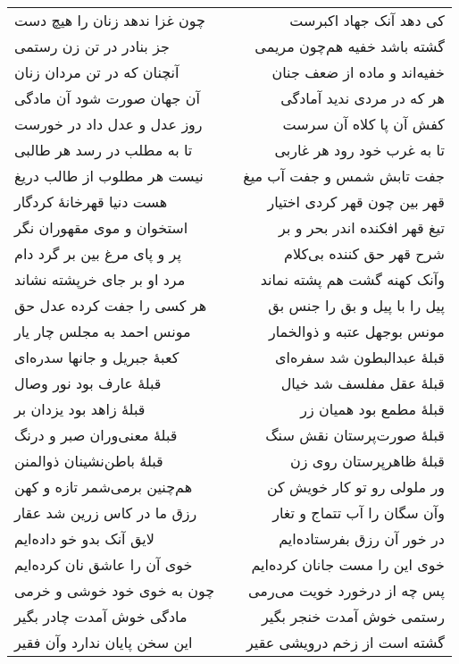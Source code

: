 \begin{center}
\begin{longtable}{l p{0.5cm} r}
\\
چون غزا ندهد زنان را هیچ دست
&&
کی دهد آنک جهاد اکبرست
\\
جز بنادر در تن زن رستمی
&&
گشته باشد خفیه هم‌چون مریمی
\\
آنچنان که در تن مردان زنان
&&
خفیه‌اند و ماده از ضعف جنان
\\
آن جهان صورت شود آن مادگی
&&
هر که در مردی ندید آمادگی
\\
روز عدل و عدل داد در خورست
&&
کفش آن پا کلاه آن سرست
\\
تا به مطلب در رسد هر طالبی
&&
تا به غرب خود رود هر غاربی
\\
نیست هر مطلوب از طالب دریغ
&&
جفت تابش شمس و جفت آب میغ
\\
هست دنیا قهرخانهٔ کردگار
&&
قهر بین چون قهر کردی اختیار
\\
استخوان و موی مقهوران نگر
&&
تیغ قهر افکنده اندر بحر و بر
\\
پر و پای مرغ بین بر گرد دام
&&
شرح قهر حق کننده بی‌کلام
\\
مرد او بر جای خرپشته نشاند
&&
وآنک کهنه گشت هم پشته نماند
\\
هر کسی را جفت کرده عدل حق
&&
پیل را با پیل و بق را جنس بق
\\
مونس احمد به مجلس چار یار
&&
مونس بوجهل عتبه و ذوالخمار
\\
کعبهٔ جبریل و جانها سدره‌ای
&&
قبلهٔ عبدالبطون شد سفره‌ای
\\
قبلهٔ عارف بود نور وصال
&&
قبلهٔ عقل مفلسف شد خیال
\\
قبلهٔ زاهد بود یزدان بر
&&
قبلهٔ مطمع بود همیان زر
\\
قبلهٔ معنی‌وران صبر و درنگ
&&
قبلهٔ صورت‌پرستان نقش سنگ
\\
قبلهٔ باطن‌نشینان ذوالمنن
&&
قبلهٔ ظاهرپرستان روی زن
\\
هم‌چنین برمی‌شمر تازه و کهن
&&
ور ملولی رو تو کار خویش کن
\\
رزق ما در کاس زرین شد عقار
&&
وآن سگان را آب تتماج و تغار
\\
لایق آنک بدو خو داده‌ایم
&&
در خور آن رزق بفرستاده‌ایم
\\
خوی آن را عاشق نان کرده‌ایم
&&
خوی این را مست جانان کرده‌ایم
\\
چون به خوی خود خوشی و خرمی
&&
پس چه از درخورد خویت می‌رمی
\\
مادگی خوش آمدت چادر بگیر
&&
رستمی خوش آمدت خنجر بگیر
\\
این سخن پایان ندارد وآن فقیر
&&
گشته است از زخم درویشی عقیر
\\
\end{longtable}
\end{center}
